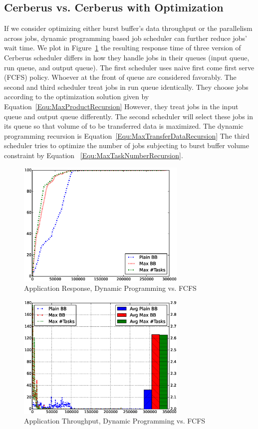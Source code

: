 \subsection{Cerberus vs. Cerberus with Optimization}
If we consider optimizing either burst buffer's data throughput or the parallelism across jobs,
dynamic programming based job scheduler can further reduce jobs' wait time.
We plot in Figure~\ref{Fig:DPvsFIFOResponse} the resulting response time of
three version of Cerberus scheduler differs in
how they handle jobs in their queues (input queue, run queue, and output queue).
The first scheduler uses naive first come first serve (FCFS) policy.
Whoever at the front of queue are considered favorably.
The second and third scheduler treat jobs in run queue identically.
They choose jobs according to the optimization solution given by Equation~\ref{Equ:MaxProductRecursion}
However, they treat jobs in the input queue and output queue differently.
The second scheduler will select these jobs in its queue so that
volume of to be transferred data is maximized.
The dynamic programming recursion is Equation~\ref{Equ:MaxTransferDataRecursion}
The third scheduler tries to optimize the number of jobs
subjecting to burst buffer volume constraint by Equation ~\ref{Equ:MaxTaskNumberRecursion}.




\begin{figure}[!t]
\centering
\includegraphics[width=3.2in]{DrawDPvsFIFO/1000jobs_dp_vs_fifo_response}
\caption{Application Response, Dynamic Programming vs. FCFS}
\label{Fig:DPvsFIFOResponse}
\end{figure}


\begin{figure}[!t]
\centering
\includegraphics[width=3.2in]{DrawDPvsFIFO/1000jobs_dp_vs_fifo_throughput}
\caption{Application Throughput, Dynamic Programming vs. FCFS}
\label{Fig:DPvsFIFOThroughput}
\end{figure}


